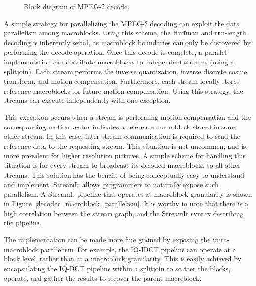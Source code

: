 \begin{figure}[htbp]
\centerline{}
\caption{Block diagram of MPEG-2 decode.}
\label{fig:dec_block}
\end{figure}

A simple strategy for parallelizing the MPEG-2 decoding can exploit
the data parallelism among macroblocks. Using this scheme, the Huffman
and run-length decoding is inherently serial, as macroblock boundaries
can only be discovered by performing the decode operation.  Once this
decode is complete, a parallel implementation can distribute
macroblocks to independent streams (using a splitjoin). Each stream
performs the inverse quantization, inverse discrete cosine transform,
and motion compensation. Furthermore, each stream locally stores
reference macroblocks for future motion compensation. Using this
strategy, the streams can execute independently with one exception.

\begin{figure*}[t]
\caption{An MPEG-2 Decoder exploiting macroblock parallelism.}
\label{decoder_macroblock_parallelism}
\end{figure*}

This exception occurs when a stream is performing motion compensation
and the corresponding motion vector indicates a reference macroblock
stored in some other stream. In this case, inter-stream communication
is required to send the reference data to the requesting stream. This
situation is not uncommon, and is more prevalent for higher resolution
pictures. A simple scheme for handling this situation is for every
stream to broadcast its decoded macroblocks to all other streams. This
solution has the benefit of being conceptually easy to understand and
implement. StreamIt allows programmers to naturally expose such
parallelism. A StreamIt pipeline that operates at macroblock
granularity is shown in Figure~\ref{decoder_macroblock_parallelism}. It is
worthy to note that there is a high correlation between the stream
graph, and the StreamIt syntax describing the pipeline.

The implementation can be made more fine grained by exposing the
intra-macroblock parallelism. For example, the IQ-IDCT pipeline can
operate at a block level, rather than at a macroblock
granularity. This is easily achieved by encapsulating the IQ-DCT pipeline
within a splitjoin to scatter the blocks, operate, and gather the
results to recover the parent macroblock.

